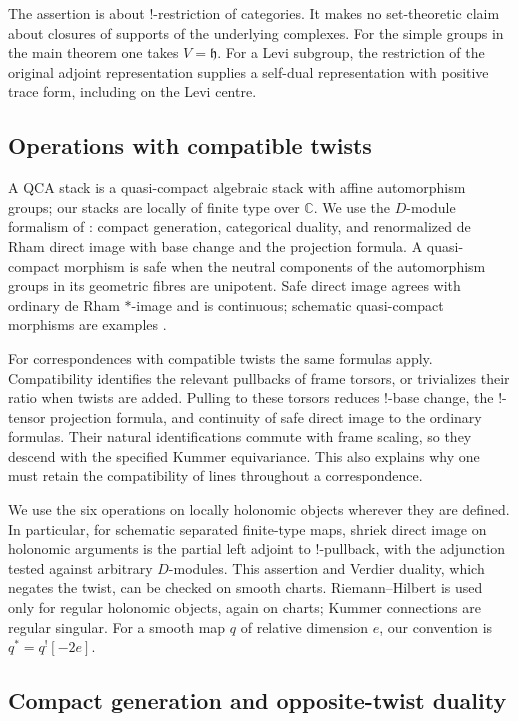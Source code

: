 The assertion is about $!$-restriction of categories.  It makes no
set-theoretic claim about closures of supports of the underlying
complexes.  For the simple groups in the main theorem one takes
$V=\mathfrak h$.  For a Levi subgroup, the restriction of the original
adjoint representation supplies a self-dual representation with positive
trace form, including on the Levi centre.

\subsection{Operations with compatible twists}\label{foundations:operations}

A QCA stack is a quasi-compact algebraic stack with affine automorphism
groups; our stacks are locally of finite type over $\mathbb C$.
We use the $D$-module formalism of
\cite{DrinfeldGaitsgoryFiniteness}: compact generation, categorical
duality, and renormalized de Rham direct image with base change and the
projection formula.  A quasi-compact morphism is safe when the neutral
components of the automorphism groups in its geometric fibres are
unipotent.  Safe direct image agrees with ordinary de Rham $*$-image and
is continuous; schematic quasi-compact morphisms are examples
\cite[Sections~9--10]{DrinfeldGaitsgoryFiniteness}.

For correspondences with compatible twists the same formulas apply.
Compatibility identifies the relevant pullbacks of frame torsors, or
trivializes their ratio when twists are added.  Pulling to these torsors
reduces $!$-base change, the $!$-tensor projection formula, and continuity
of safe direct image to the ordinary formulas.  Their natural
identifications commute with frame scaling, so they descend with the
specified Kummer equivariance.  This also explains why one must retain
the compatibility of lines throughout a correspondence.

We use the six operations on locally holonomic objects wherever they
are defined.  In particular, for schematic separated finite-type maps,
shriek direct image on holonomic arguments is the partial left adjoint
to $!$-pullback, with the adjunction tested against arbitrary $D$-modules.
This assertion and Verdier duality, which negates the twist, can be
checked on smooth charts.  Riemann--Hilbert is used only for regular
holonomic objects, again on charts; Kummer connections are regular
singular.  For a smooth map $q$ of relative dimension $e$, our convention
is $q^*=q^![-2e]$.

\subsection{Compact generation and opposite-twist duality}

